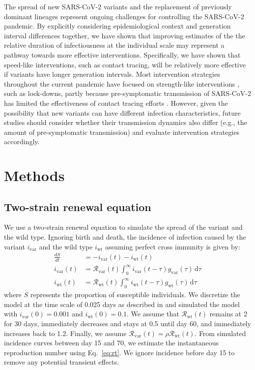 \documentclass[12pt]{article}
\newcommand{\eref}[1]{Eq.~\ref{eq:#1}}
\newcommand{\vvvar}{\mathrm{var}}
\newcommand{\wwwt}{\mathrm{wt}}
\newcommand{\Rx}[1]{\ensuremath{{\mathcal R}_{#1}}\xspace}
\newcommand{\Rw}{\Rx{\wwwt}}
\newcommand{\Rv}{\Rx{\vvvar}}
\newcommand{\dd}[1]{\ensuremath{\, \mathrm{d}#1}}
\newcommand{\dtau}{\dd{\tau}}
\newcommand{\ix}[1]{\ensuremath{{i}_{#1}}\xspace}
\newcommand{\iw}{\ix{\wwwt}}
\newcommand{\iv}{\ix{\vvvar}}
\begin{document}
The spread of new SARS-CoV-2 variants and the replacement of previously dominant lineages represent ongoing challenges for controlling the SARS-CoV-2 pandemic.  
By explicitly considering epidemiological context and generation interval differences together, we have shown that improving estimates of the the relative duration of infectiousness at the individual scale may represent a pathway towards more effective interventions. 
Specifically, we have shown that speed-like interventions, such as contact tracing, will be relatively more effective if variants have longer generation intervals.
Most intervention strategies throughout the current pandemic have focused on strength-like interventions \citep{flaxman2020Rt}, such as lock-downs, partly because pre-symptomatic transmission of SARS-CoV-2 has limited the effectiveness of contact tracing efforts \citep{hellewell2020feasibility}.
However, given the possibility that new variants can have different infection characteristics, future studies should consider whether their transmission dynamics also differ (e.g., the amount of pre-symptomatic transmission) and evaluate intervention strategies accordingly.

\section{Methods}

\subsection{Two-strain renewal equation}

We use a two-strain renewal equation to simulate the spread of the variant and the wild type.
Ignoring birth and death, the incidence of infection caused by the variant $\iv$ and the wild type $\iw$ assuming perfect cross immunity is given by:
\begin{align}
\frac{dS}{dt} &= - \iv(t) - \iw(t)\\
\iv(t) &= \Rv(t) \int_{0}^\infty \iv(t-\tau) g_{\mathrm{var}}(\tau) \dtau\\
\iw(t) &= \Rw(t) \int_{0}^\infty \iw(t-\tau) g_{\mathrm{wt}}(\tau) \dtau
\end{align}
where $S$ represents the proportion of susceptible individuals.
We discretize the model at the time scale of 0.025 days as described in \citep{park2021forward} and simulated the model with $\iv(0) = 0.001$ and $\iw(0) = 0.1$.
We assume that $\Rw(t)$ remains at 2 for 30 days, immediately decreases and stays at 0.5 until day 60, and immediately increases back to 1.2.
Finally, we assume $\Rv(t) = \rho \Rw(t)$.
From simulated incidence curves between day 15 and 70, we estimate the instantaneous reproduction number using \eref{rt}.
We ignore incidence before day 15 to remove any potential transient effects.


\end{document}
